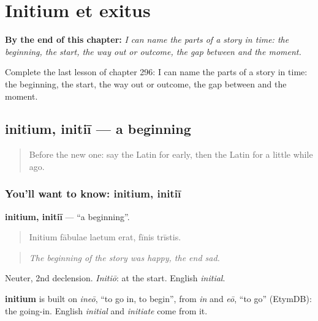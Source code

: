 
\chapter{Initium et exitus}
\label{ch:la-initium-et-exitus}

\begin{chapteropening}
\textbf{By the end of this chapter:} \emph{I can name the parts of a story in time: the beginning, the start, the way out or outcome, the gap between and the moment.}

Complete the last lesson of chapter 296: I can name the parts of a story in time: the beginning, the start, the way out or outcome, the gap between and the moment.
\end{chapteropening}

\section[initium, initiī]{initium, initiī — a beginning}

\label{lesson:LA-C296-initium}



\begin{quote}
Before the new one: say the Latin for early, then the Latin for a little while ago.
\end{quote}

\subsection*{You'll want to know: initium, initiī}
\textbf{initium, initiī} — \textquotedblleft{}a beginning\textquotedblright{}.

\begin{quote}
Initium fābulae laetum erat, fīnis trīstis.
\end{quote}

\begin{quote}
\emph{The beginning of the story was happy, the end sad.}
\end{quote}

Neuter, 2nd declension. \emph{Initiō}: at the start. English \emph{initial}.

\begin{cousinweb}
\textbf{initium} is built on \emph{ineō}, \textquotedblleft{}to go in, to begin\textquotedblright{}, from \emph{in} and \emph{eō}, \textquotedblleft{}to go\textquotedblright{} (EtymDB): the going-in. English \emph{initial} and \emph{initiate} come from it.
\end{cousinweb}

